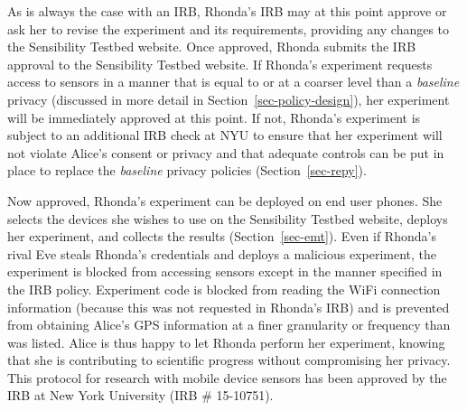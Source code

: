 As is always the case with an IRB, Rhonda's IRB may at this point approve 
or ask her to revise the experiment and its requirements, providing any
changes to the Sensibility Testbed website.  Once approved, Rhonda submits 
the IRB approval to the Sensibility Testbed website.  If 
Rhonda's experiment requests access to sensors in a manner that is 
equal to or at a coarser level than a \emph{baseline} privacy (discussed in more detail
in Section~\ref{sec-policy-design}), her experiment will be immediately approved at this point.
If not, Rhonda's experiment is subject to an additional IRB check at NYU 
to ensure that her experiment will not violate Alice's consent or privacy and
that adequate controls can be put in place to replace the \emph{baseline}
privacy policies (Section~\ref{sec-repy}).

Now approved, Rhonda's experiment can be deployed on end user phones.  She
selects the devices she wishes to use on the Sensibility Testbed 
website, deploys her experiment, and collects the results (Section~\ref{sec-emt}).  
Even if Rhonda's rival Eve steals Rhonda's credentials and deploys a
malicious experiment, the experiment is blocked from accessing sensors except 
in the manner specified in the IRB policy.  Experiment code is blocked from 
reading the WiFi connection information (because this was not requested in
Rhonda's IRB) and is prevented from obtaining Alice's GPS information at a 
finer granularity or frequency than was listed. 
Alice is thus happy to let Rhonda perform her experiment, 
knowing that she is contributing to scientific progress without compromising 
her privacy. 
%
%
This protocol for research with mobile device sensors has been approved by
the IRB at New York University (IRB \# 15-10751).  

